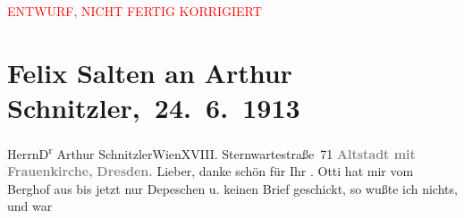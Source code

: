 
\begin{center}
            \textcolor{red}{ENTWURF, NICHT FERTIG KORRIGIERT}
                      \end{center}
            
         
         \renewcommand{\erwaehntePersonen}{Personen: Lili Cappellini, Felix Salten, Ottilie Salten, Heinrich Schnitzler, Olga Schnitzler}
         \renewcommand{\erwaehnteOrte}{Orte: Berghof, Dresden, Frauenkirche, Sternwartestraße 71, Wien}
         \renewcommand{\erwaehnteWerke}{}
               \section[ Felix Salten an Arthur Schnitzler, 24. 6. 1913]{ Felix Salten an Arthur Schnitzler, 24. 6. 1913}\nopagebreak{}\rehead{ }\begin{ledgroupsized}[t]{13cm}\normalsize\beginnumbering \toendnotes[C]{\smallbreak\pagebreak[2]} 
\toendnotes[C]{\smallbreak}\pstart{}{\pb}Herrn\pend{}\pstart{}D\textsuperscript{r} Arthur Schnitzler\pend{}\pstart{}Wien\pend{}\pstart{}XVIII. Sternwartestraße 71\pend{}{\bigskip}\pstart
           \noindent{}\centering{}{\pb}\textcolor{gray}{\textbf{Altstadt mit Frauenkirche\textcolor{gray}{,}}}\pend
           \pstart
           \noindent{}\centering{}\textcolor{gray}{\textbf{Dresden.}}\pend
           \pstart{}{\pb}Lieber,\pend\pstart
           danke schön für Ihr \label{K_L03561-1v}\label{K_L03561-1h}. Otti hat mir vom Berghof
               aus bis jetzt nur Depeschen u. keinen Brief geschickt, so wußte ich nichts, und war

\end{ledgroupsized}
